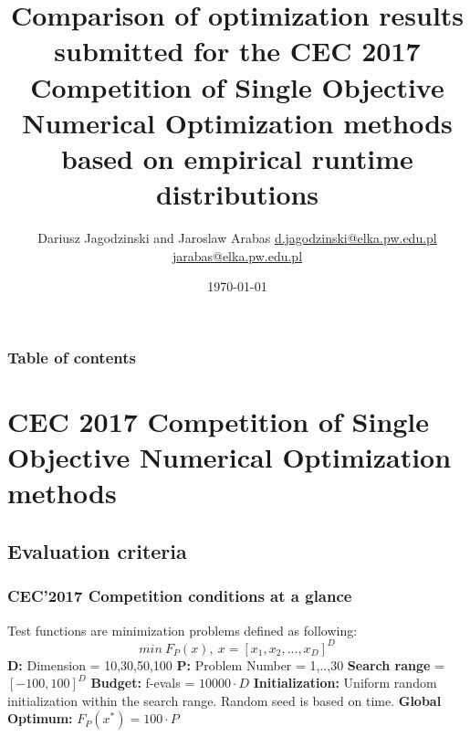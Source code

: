 \documentclass[hyperref={pdfpagelabels=false}]{beamer}
\title{Comparison of optimization results submitted for the 
CEC 2017 Competition of Single Objective Numerical Optimization methods
based on empirical runtime distributions}
\author{Dariusz Jagodzinski and Jaroslaw Arabas \newline\url{d.jagodzinski@elka.pw.edu.pl}\newline
\url{jarabas@elka.pw.edu.pl}}
\date{\today}
\begin{document}
\begin{frame}
\titlepage
\end{frame} 


\begin{frame}
\frametitle{Table of contents}
\tableofcontents
\end{frame} 


\section{
CEC 2017 Competition of Single Objective Numerical Optimization methods
} 
\subsection{Evaluation criteria}
\begin{frame}
\frametitle{CEC'2017 Competition conditions at a glance} 
Test functions are minimization problems defined as following:
\begin{equation*}
  min\ F_P(x),\ x=[x_1,x_2,...,x_D]^D
\end{equation*}
\textbf{D:} Dimension = {10,30,50,100}
\textbf{P:} Problem Number = {1,..,30}
\textbf{Search range} = $[-100,100]^D$
\textbf{Budget:} f-evals = $10000\cdot D$
\textbf{Initialization:} Uniform random initialization within the search range. Random seed is based on time.
\newline \textbf{Global Optimum:} $F_P(x^*) =100\cdot P $

%
    
\end{frame}
\end{document}
